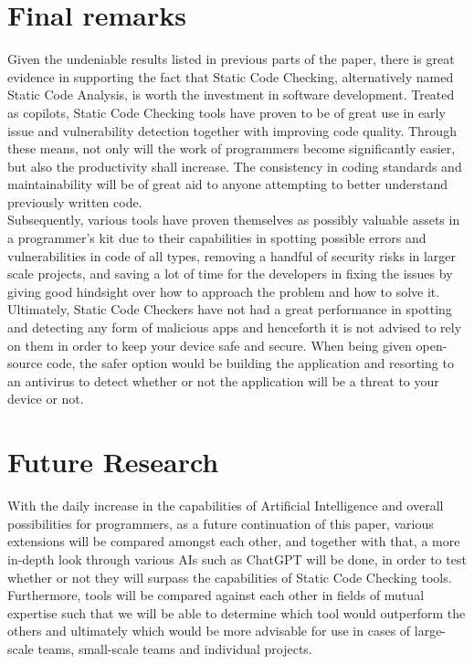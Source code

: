 \section{Final remarks}

Given the undeniable results listed in previous parts of the paper, there is great evidence in supporting the fact that Static Code Checking, alternatively named Static Code Analysis, is worth the investment in software development. Treated as copilots, Static Code Checking tools have proven to be of great use in early issue and vulnerability detection together with improving code quality. Through these means, not only will the work of programmers become significantly easier, but also the productivity shall increase. The consistency in coding standards and maintainability will be of great aid to anyone attempting to better understand previously written code.\\  

\noindent Subsequently, various tools have proven themselves as possibly valuable assets in a programmer's kit due to their capabilities in spotting possible errors and vulnerabilities in code of all types, removing a handful of security risks in larger scale projects, and saving a lot of time for the developers in fixing the issues by giving good hindsight over how to approach the problem and how to solve it.\\

\noindent Ultimately, Static Code Checkers have not had a great performance in spotting and detecting any form of malicious apps and henceforth it is not advised to rely on them in order to keep your device safe and secure. When being given open-source code, the safer option would be building the application and resorting to an antivirus to detect whether or not the application will be a threat to your device or not.

\section{Future Research}

With the daily increase in the capabilities of Artificial Intelligence and overall possibilities for programmers, as a future continuation of this paper, various extensions will be compared amongst each other, and together with that, a more in-depth look through various AIs such as ChatGPT will be done, in order to test whether or not they will surpass the capabilities of Static Code Checking tools. \\

\noindent Furthermore, tools will be compared against each other in fields of mutual expertise such that we will be able to determine which tool would outperform the others and ultimately which would be more advisable for use in cases of large-scale teams, small-scale teams and individual projects. 